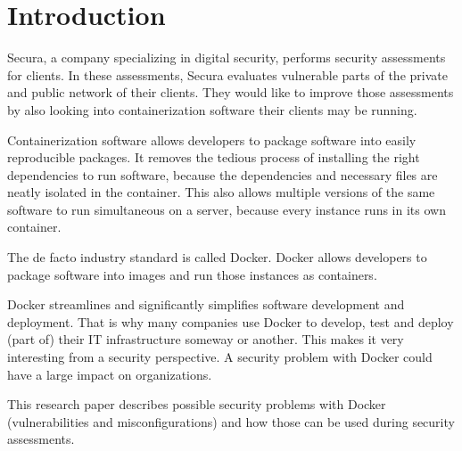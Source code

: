\chapter{Introduction}

Secura, a company specializing in digital security, performs security assessments for clients. In these assessments, Secura evaluates vulnerable parts of the private and public network of their clients. They would like to improve those assessments by also looking into containerization software their clients may be running.

\hfill

Containerization software allows developers to package software into easily reproducible packages.
It removes the tedious process of installing the right dependencies to run software, because the dependencies and necessary files are neatly isolated in the container. This also allows multiple versions of the same software to run simultaneous on a server, because every instance runs in its own container.

The de facto industry standard is called Docker. Docker allows developers to package software into images and run those instances as containers.

Docker streamlines and significantly simplifies software development and deployment. That is why many companies use Docker to develop, test and deploy (part of) their IT infrastructure someway or another. This makes it very interesting from a security perspective. A security problem with Docker could have a large impact on organizations.

\hfill

This research paper describes possible security problems with Docker (vulnerabilities and misconfigurations) and how those can be used during security assessments.
